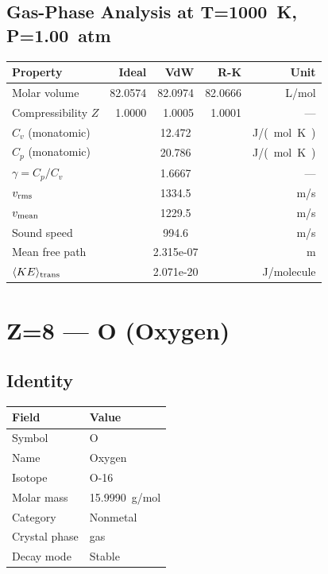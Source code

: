 \documentclass[11pt,a4paper]{article}
\begin{document}
\subsection{Gas-Phase Analysis at T=\SI{1000}{K}, P=\SI{1.00}{atm}}
\begin{tabular}{lrrrr}
  \toprule
  Property & Ideal & VdW & R-K & Unit \\
  \midrule
  Molar volume & 82.0574 & 82.0974 & 82.0666 & \si{L/mol} \\
  Compressibility $Z$ & 1.0000 & 1.0005 & 1.0001 & --- \\
  \midrule
  $C_v$ (monatomic) & \multicolumn{3}{c}{12.472} & \si{J/(mol.K)} \\
  $C_p$ (monatomic) & \multicolumn{3}{c}{20.786} & \si{J/(mol.K)} \\
  $\gamma = C_p/C_v$ & \multicolumn{3}{c}{1.6667} & --- \\
  $v_{\rm rms}$ & \multicolumn{3}{c}{1334.5} & \si{m/s} \\
  $v_{\rm mean}$ & \multicolumn{3}{c}{1229.5} & \si{m/s} \\
  Sound speed & \multicolumn{3}{c}{994.6} & \si{m/s} \\
  Mean free path & \multicolumn{3}{c}{2.315e-07} & \si{m} \\
  $\langle KE \rangle_{\rm trans}$ & \multicolumn{3}{c}{2.071e-20} & \si{J/molecule} \\
  \bottomrule
\end{tabular}

\newpage

\section{Z=8 --- O (Oxygen)}
\label{sec:Z8}

\subsection{Identity}
\begin{tabular}{ll}
  \toprule
  Field & Value \\
  \midrule
  Symbol & O \\
  Name & Oxygen \\
  Isotope & O-16 \\
  Molar mass & \SI{15.9990}{g/mol} \\
  Category & Nonmetal \\
  Crystal phase & gas \\
  Decay mode & Stable \\
  \bottomrule
\end{tabular}
\end{document}
